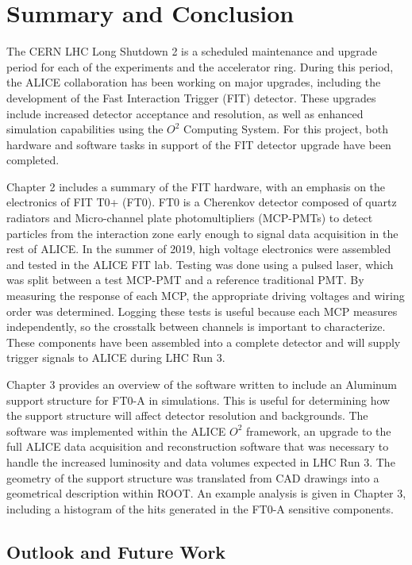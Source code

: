 \chapter{Summary and Conclusion}

The CERN LHC Long Shutdown 2 is a scheduled maintenance and upgrade period for each of the experiments and the accelerator ring. During this period, the ALICE collaboration has been working on major upgrades, including the development of the Fast Interaction Trigger (FIT) detector. These upgrades include increased detector acceptance and resolution, as well as enhanced simulation capabilities using the $O^2$ Computing System. For this project, both hardware and software tasks in support of the FIT detector upgrade have been completed.  

Chapter 2 includes a summary of the FIT hardware, with an emphasis on the electronics of FIT T0+ (FT0). FT0 is a Cherenkov detector composed of quartz radiators and Micro-channel plate photomultipliers (MCP-PMTs) to detect particles from the interaction zone early enough to signal data acquisition in the rest of ALICE.  In the summer of 2019, high voltage electronics were assembled and tested in the ALICE FIT lab. Testing was done using a pulsed laser, which was split between a test MCP-PMT and a reference traditional PMT. By measuring the response of each MCP, the appropriate driving voltages and wiring order was determined. Logging these tests is useful because each MCP measures independently, so the crosstalk between channels is important to characterize.  These components have been assembled into a complete detector and will supply trigger signals to ALICE during LHC Run 3. 

Chapter 3 provides an overview of the software written to include an Aluminum support structure for FT0-A in simulations. This is useful for determining how the support structure will affect detector resolution and backgrounds. The software was implemented within the ALICE $O^2$ framework, an upgrade to the full ALICE data acquisition and reconstruction software that was necessary to handle the increased luminosity and data volumes expected in LHC Run 3. The geometry of the support structure was translated from CAD drawings into a geometrical description within ROOT. An example analysis is given in Chapter 3, including a histogram of the hits generated in the FT0-A sensitive components.


\section{Outlook and Future Work}

